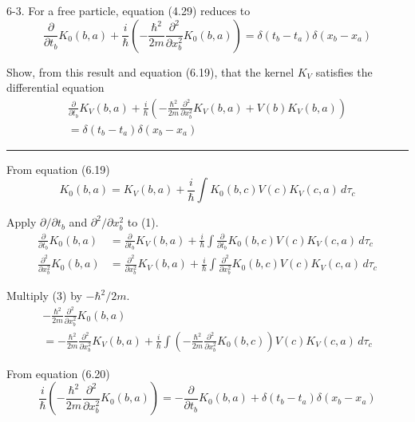\documentclass[12pt]{article}
\begin{document}
6-3.
For a free particle, equation (4.29) reduces to
\begin{equation*}
\frac{\partial}{\partial t_b}K_0(b,a)+\frac{i}{\hbar}
\left(-\frac{\hbar^2}{2m}\frac{\partial^2}{\partial x_b^2}K_0(b,a)\right)
=\delta(t_b-t_a)\delta(x_b-x_a)
\tag{6.20}
\end{equation*}

Show, from this result and equation (6.19), that the kernel
$K_V$ satisfies the differential equation
\begin{multline*}
\frac{\partial}{\partial t_b}K_V(b,a)+\frac{i}{\hbar}
\left(-\frac{\hbar^2}{2m}\frac{\partial^2}{\partial x_b^2}K_V(b,a)+V(b)K_V(b,a)\right)
\\
=\delta(t_b-t_a)\delta(x_b-x_a)
\tag{6.21}
\end{multline*}

\bigskip
\hrule

\bigskip
From equation (6.19)
\begin{equation*}
K_0(b,a)=K_V(b,a)+\frac{i}{\hbar}
\int K_0(b,c)V(c)K_V(c,a)\,d\tau_c
\tag{1}
\end{equation*}

Apply $\partial/\partial t_b$ and $\partial^2/\partial x_b^2$ to (1).
\begin{align*}
\frac{\partial}{\partial t_b}K_0(b,a)
&=\frac{\partial}{\partial t_b}K_V(b,a)
+\frac{i}{\hbar}\int \frac{\partial}{\partial t_b}K_0(b,c)V(c)K_V(c,a)\,d\tau_c
\tag{2}
\\
\frac{\partial^2}{\partial x_b^2}K_0(b,a)
&=\frac{\partial^2}{\partial x_b^2}K_V(b,a)
+\frac{i}{\hbar}\int \frac{\partial^2}{\partial x_b^2}K_0(b,c)V(c)K_V(c,a)\,d\tau_c
\tag{3}
\end{align*}

Multiply (3) by $-\hbar^2/2m$.
\begin{multline*}
-\frac{\hbar^2}{2m}\frac{\partial^2}{\partial x_b^2}K_0(b,a)
\\
=-\frac{\hbar^2}{2m}\frac{\partial^2}{\partial x_b^2}K_V(b,a)
+\frac{i}{\hbar}\int\left(-\frac{\hbar^2}{2m}\frac{\partial^2}{\partial x_b^2}K_0(b,c)\right)
V(c)K_V(c,a)\,d\tau_c
\tag{4}
\end{multline*}

From equation (6.20)
\begin{equation*}
\frac{i}{\hbar}\left(-\frac{\hbar^2}{2m}\frac{\partial^2}{\partial x_b^2}K_0(b,a)\right)
=
-\frac{\partial}{\partial t_b}K_0(b,a)
+\delta(t_b-t_a)\delta(x_b-x_a)
\end{equation*}
\end{document}
